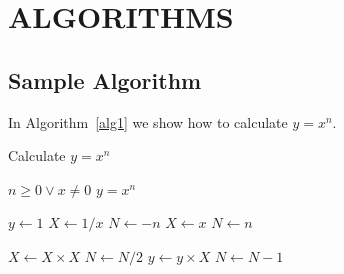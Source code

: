 \chapter{ALGORITHMS}

\section{Sample Algorithm}
In Algorithm~\ref{alg1} we show how to calculate $y=x^n$.

\begin{algorithm}
  \caption{Calculate $y = x^n$}
  \label{alg1}
  \begin{algorithmic}
%     
    \REQUIRE $n \geq 0 \vee x \neq 0$
    \ENSURE $y = x^n$

    \STATE $y \leftarrow 1$
      \STATE $X \leftarrow 1 / x$
      \STATE $N \leftarrow -n$
    \ELSE
      \STATE $X \leftarrow x$
      \STATE $N \leftarrow n$
    \ENDIF

	\STATE $X \leftarrow X \times X$
	\STATE $N \leftarrow N / 2$
      \ELSE[$N$ is odd]
	\STATE $y \leftarrow y \times X$
	\STATE $N \leftarrow N - 1$
      \ENDIF
    \ENDWHILE


  \end{algorithmic}
\end{algorithm}

\endinput
